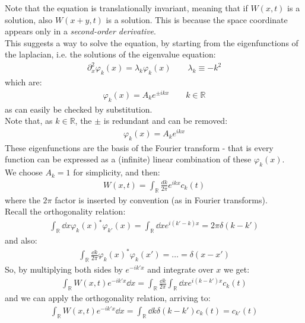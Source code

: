 \documentclass[../template.tex]{subfiles}
\begin{document}
Note that the equation is translationally invariant, meaning that if $W(x,t)$ is a solution, also $W(x + y,t)$ is a solution. This is because the space coordinate appears only in a \textit{second-order derivative}.\\
This suggests a way to solve the equation, by starting from the eigenfunctions of the laplacian, i.e. the solutions of the eigenvalue equation:
\begin{align*}
    \partial_x^2 \varphi_k(x) = \lambda_k \varphi_k(x) \qquad \lambda_k \equiv -k^2
\end{align*}
which are:
\begin{align*}
    \varphi_k(x) = A_k e^{\pm i k x} \qquad k\in \mathbb{R}
\end{align*}
as can easily be checked by substitution.\\
Note that, as $k \in \mathbb{R}$, the $\pm$ is redundant and can be removed:
\begin{align*}
    \varphi_k(x) = A_k e^{ikx}
\end{align*}  
These eigenfunctions are the basis of the Fourier transform - that is every function can be expressed as a (infinite) linear combination of these $\varphi_k(x)$.\\
We choose $A_k = 1$ for simplicity, and then:
\begin{align*}
    W(x,t) = \int_{\mathbb{R}} \frac{dk}{2 \pi} e^{ikx} c_k(t) 
\end{align*}  
where the $2\pi$ factor is inserted by convention (as in Fourier transforms).\\
Recall the orthogonality relation:
\begin{align*}
    \int_{\mathbb{R}} \dd{x} \varphi_k(x)^* \varphi_{k'}(x) = \int_{\mathbb{R}} \dd{x} e^{i(k'-k)x} = 2\pi \delta(k-k')
\end{align*} 
and also:
\begin{align*}
    \int_{\mathbb{R}} \frac{\dd{k}}{2 \pi} \varphi_k(x)^* \varphi_k (x') = \dots = \delta(x-x') 
\end{align*}
So, by multiplying both sides by $e^{-ik'x}$ and integrate over $x$ we get:
\begin{align*}
    \int_{\mathbb{R}} W(x,t) e^{-ik'x} \dd{x} = \int_{\mathbb{R}} \frac{\dd{k}}{2\pi}  \int_{\mathbb{R}} \dd{x} e^{i(k-k')x} c_k(t)
\end{align*}  
and we can apply the orthogonality relation, arriving to:
\begin{align*}
    \int_{\mathbb{R}} W(x,t) e^{-ik'x}\dd{x} = \int_{\mathbb{R}} \dd{k} \delta(k-k') c_k(t) = c_{k'}(t)
\end{align*}
\end{document}
